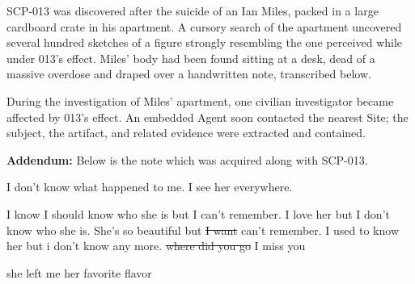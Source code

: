 SCP-013 was discovered after the suicide of an Ian Miles, packed in a large cardboard crate in his apartment. A cursory search of the apartment uncovered several hundred sketches of a figure strongly resembling the one perceived while under 013's effect. Miles' body had been found sitting at a desk, dead of a massive overdose and draped over a handwritten note, transcribed below.

During the investigation of Miles' apartment, one civilian investigator became affected by 013's effect. An embedded Agent soon contacted the nearest Site; the subject, the artifact, and related evidence were extracted and contained.

\textbf{Addendum:} Below is the note which was acquired along with SCP-013.

\begin{leftbar}
\begin{flushleft}

I don't know what happened to me. I see her everywhere.\linebreak

I know I should know who she is but I can't remember. I love her but I don't know who she is. She's so beautiful but \sout{I want} can't remember. I used to know her but i don't know any more. \sout{where did you go} I miss you\linebreak

she left me her favorite flavor
\end{flushleft}
\end{leftbar}